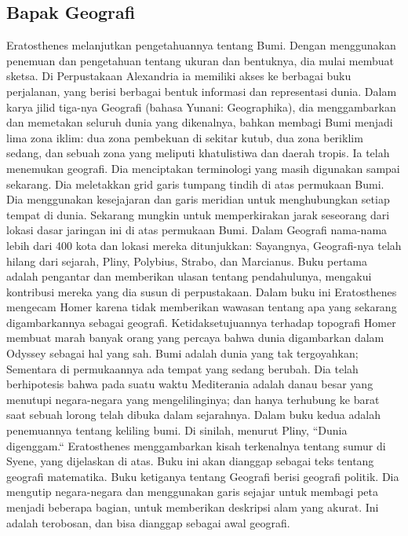\subsection{Bapak Geografi}
Eratosthenes melanjutkan pengetahuannya tentang Bumi. Dengan menggunakan penemuan dan pengetahuan tentang ukuran dan bentuknya, dia mulai membuat sketsa. Di Perpustakaan Alexandria ia memiliki akses ke berbagai buku perjalanan, yang berisi berbagai bentuk informasi dan representasi dunia. \cite{smith2005dictionary} Dalam karya jilid tiga-nya Geografi (bahasa Yunani: Geographika), dia menggambarkan dan memetakan seluruh dunia yang dikenalnya, bahkan membagi Bumi menjadi lima zona iklim: \cite{grimbly2013encyclopedia} dua zona pembekuan di sekitar kutub, dua zona beriklim sedang, dan sebuah zona yang meliputi khatulistiwa dan daerah tropis. Ia telah menemukan geografi. Dia menciptakan terminologi yang masih digunakan sampai sekarang. Dia meletakkan grid garis tumpang tindih di atas permukaan Bumi. Dia menggunakan kesejajaran dan garis meridian untuk menghubungkan setiap tempat di dunia. Sekarang mungkin untuk memperkirakan jarak seseorang dari lokasi dasar jaringan ini di atas permukaan Bumi. Dalam Geografi nama-nama lebih dari 400 kota dan lokasi mereka ditunjukkan:  Sayangnya, Geografi-nya telah hilang dari sejarah, Pliny, Polybius, Strabo, dan Marcianus. \cite{roller2010eratosthenes}
Buku pertama adalah pengantar dan memberikan ulasan tentang pendahulunya, mengakui kontribusi mereka yang dia susun di perpustakaan. Dalam buku ini Eratosthenes mengecam Homer karena tidak memberikan wawasan tentang apa yang sekarang digambarkannya sebagai geografi. Ketidaksetujuannya terhadap topografi Homer membuat marah banyak orang yang percaya bahwa dunia digambarkan dalam Odyssey sebagai hal yang sah. \cite{eckerman2011eratosthenes} Bumi adalah dunia yang tak tergoyahkan; Sementara di permukaannya ada tempat yang sedang berubah. Dia telah berhipotesis bahwa pada suatu waktu Mediterania adalah danau besar yang menutupi negara-negara yang mengelilinginya; dan hanya terhubung ke barat saat sebuah lorong telah dibuka dalam sejarahnya.
Dalam buku kedua adalah penemuannya tentang keliling bumi. Di sinilah, menurut Pliny, ``Dunia digenggam.`` Eratosthenes menggambarkan kisah terkenalnya tentang sumur di Syene, yang dijelaskan di atas. Buku ini akan dianggap sebagai teks tentang geografi matematika.
Buku ketiganya tentang Geografi berisi geografi politik. Dia mengutip negara-negara dan menggunakan garis sejajar untuk membagi peta menjadi beberapa bagian, untuk memberikan deskripsi alam yang akurat. Ini adalah terobosan, dan bisa dianggap sebagai awal geografi. \cite{smith2005dictionary}
